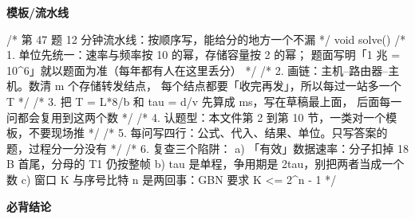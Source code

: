 \documentclass[10pt,a4paper]{ctexart}
\begin{document}

\textbf{模板/流水线}

\begin{codebox}
/* 第 47 题 12 分钟流水线：按顺序写，能给分的地方一个不漏 */
void solve() {
    /* 1. 单位先统一：速率与频率按 10 的幂，存储容量按 2 的幂；
          题面写明「1 兆 = 10^6」就以题面为准（每年都有人在这里丢分） */
    /* 2. 画链：主机--路由器--主机。数清 m 个存储转发结点，
          每个结点都要「收完再发」，所以每过一站多一个 T */
    /* 3. 把 T = L*8/b 和 tau = d/v 先算成 ms，写在草稿最上面，
          后面每一问都会复用到这两个数 */
    /* 4. 认题型：本文件第 2 到第 10 节，一类对一个模板，不要现场推 */
    /* 5. 每问写四行：公式、代入、结果、单位。只写答案的题，过程分一分没有 */
    /* 6. 复查三个陷阱：
          a) 「有效」数据速率：分子扣掉 18 B 首尾，分母的 T1 仍按整帧
          b) tau 是单程，争用期是 2tau，别把两者当成一个数
          c) 窗口 K 与序号比特 n 是两回事：GBN 要求 K <= 2^n - 1 */
}
\end{codebox}




\textbf{必背结论}
\end{document}
